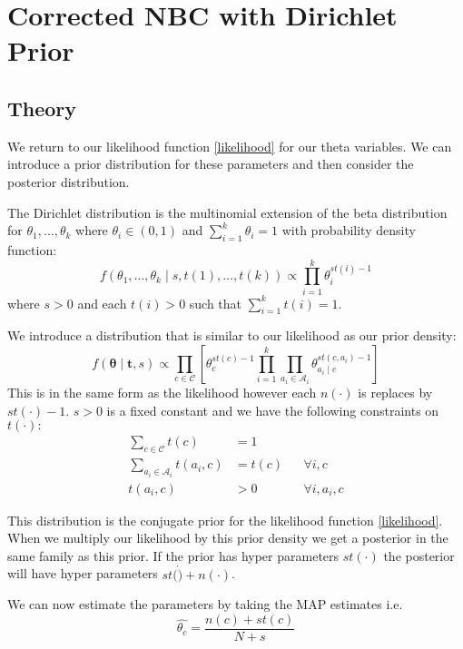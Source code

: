 \chapter{Corrected NBC with Dirichlet Prior}

\section{Theory}

We return to our likelihood function \cref{likelihood} for our theta variables.
We can introduce a prior distribution for these parameters and then consider the posterior distribution.

The Dirichlet distribution is the multinomial extension of the beta distribution for $\theta_1,\dots,\theta_k$ where $\theta_i \in (0,1)$ and $\sum_{i=1}^k \theta_i = 1$ with probability density function:
\begin{equation} \label{dirichlet_pdf}
	f(\theta_1,\dots,\theta_k \mid s, t(1),\dots,t(k)) \propto \prod_{i=1}^k \theta_i^{st(i) - 1}
\end{equation}
where $s > 0$ and each $t(i)>0$ such that $\sum_{i=1}^{k}t(i) = 1$.

We introduce a distribution that is similar to our likelihood as our prior density:
\begin{equation} \label{prior}
	f(\mathbf{\theta} \mid \mathbf{t}, s) \propto \prod_{c \in \mathcal{C}} \left[ \theta_c^{st(c) - 1} \prod_{i=1}^k \prod_{a_i \in \mathcal{A}_i} \theta_{a_i \mid c}^{st(c, a_i) - 1} \right]
\end{equation}
This is in the same form as the likelihood however each $n(\cdot)$ is replaces by $st(\cdot) - 1$.
$s > 0$ is a fixed constant and we have the following constraints on $t(\cdot):$
\begin{align}\label{prior_constraints}
	\sum_{c \in \mathcal{C}} t(c) & = 1 \\
	\sum_{a_i \in \mathcal{A}_i} t(a_i, c) & = t(c) && \forall i, c \\
	t(a_i, c) & > 0 && \forall i, a_i, c
\end{align}

This distribution is the conjugate prior for the likelihood function \cref{likelihood}.
When we multiply our likelihood by this prior density we get a posterior in the same family as this prior.
If the prior has hyper parameters $st(\cdot)$ the posterior will have hyper parameters $st(\dot) + n(\cdot)$.

We can now estimate the parameters by taking the MAP estimates i.e.
\begin{equation}
	\hat{\theta_c} = \frac{n(c) + st(c)}{N + s}
\end{equation}

